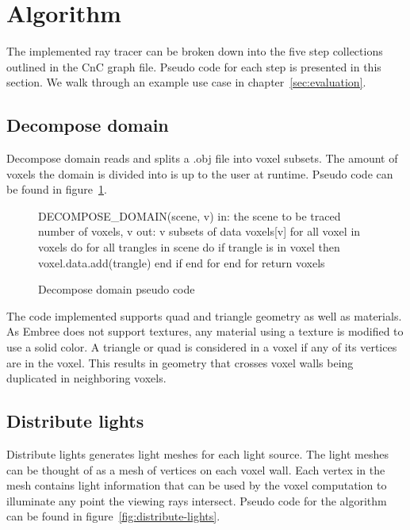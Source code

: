 \newpage

\section{Algorithm}
The implemented ray tracer can be broken down into the five step collections
outlined in the CnC graph file.  Pseudo code for each step is presented in this
section.  We walk through an example use case in chapter~\ref{sec:evaluation}.

\subsection{Decompose domain}
Decompose domain reads and splits a .obj file into voxel subsets.  The amount of
voxels the domain is divided into is up to the user at runtime.  Pseudo code can
be found in figure~\ref{fig:decompose-domain}.  

\begin{figure}[!htb]
\begin{algorithm}
DECOMPOSE_DOMAIN(scene, v)
  in:  the scene to be traced
       number of voxels, v
  out: v subsets of data
  voxels[v]
  for all voxel in voxels do
    for all trangles in scene do
      if trangle is in voxel then
        voxel.data.add(trangle)
      end if
    end for
  end for
return voxels
\end{algorithm}
\caption{Decompose domain pseudo code}
\label{fig:decompose-domain}
\end{figure}

The code implemented supports quad and triangle geometry as well as materials.  
As Embree does not support textures, any material using a texture is modified to
use a solid color.  A triangle or quad is considered in a voxel if any of its
vertices are in the voxel.  This results in geometry that crosses voxel walls 
being duplicated in neighboring voxels. 

\subsection{Distribute lights}
\label{sec:distribute-lights}
Distribute lights generates light meshes for each light source.  The light 
meshes can be thought of as a mesh of vertices on each voxel wall.  Each vertex
in the mesh contains light information that can be used by the voxel computation
to illuminate any point the viewing rays intersect.  Pseudo code for the 
algorithm can be found in figure~\ref{fig:distribute-lights}. 

